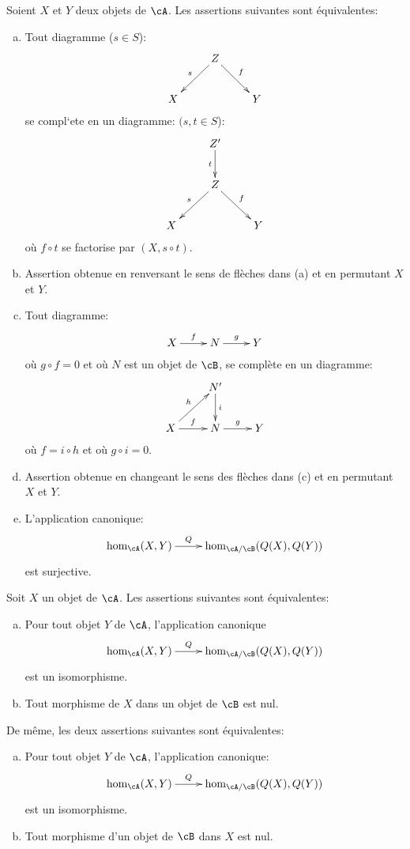 \begin{proposition}\label{VIII:2-5-2}
Soient $X$ et $Y$ deux objets de $\cA$. Les assertions suivantes sont 
\'equivalentes: 
\begin{enumerate}[(a)]
  \item Tout diagramme ($s\in S$): 
    \[\xymatrix{
      & Z \ar[dl]_-s \ar[dr]^-f \\
      X 
        & & Y 
    }\]
    se compl`ete en un diagramme: $(s,t\in S$): 
    \[\xymatrix{
      & Z' \ar[d]_-t \\
      & Z \ar[dl]_-s \ar[dr]^-f \\
      X 
        & & Y 
    }\]
    o\`u $f\circ t$ se factorise par $(X,s\circ t)$. 
  \item Assertion obtenue en renversant le sens de fl\`eches dans (a) et en 
    permutant $X$ et $Y$. 
  \item Tout diagramme: 
    \[\xymatrix{
      X \ar[r]^-f 
        & N \ar[r]^-g 
        & Y 
    }\]
    o\`u $g\circ f=0$ et o\`u $N$ est un objet de $\cB$, se compl\`ete en un 
    diagramme: 
    \[\xymatrix{
      & N' \ar[d]^-i \\
      X \ar[ur]^-h \ar[r]^-f 
        & N \ar[r]^-g 
        & Y 
    }\]
    o\`u $f=i\circ h$ et o\`u $g\circ i=0$. 
  \item Assertion obtenue en changeant le sens des fl\`eches dans (c) et en 
    permutant $X$ et $Y$. 
  \item L'application canonique: 
    \[\xymatrix{
      \hom_\cA(X,Y) \ar[r]^-Q 
        & \hom_{\cA/\cB}(Q(X),Q(Y)) 
    }\]
    est surjective. 
\end{enumerate}
\end{proposition}





\begin{proposition}\label{VIII:2-5-3}
Soit $X$ un objet de $\cA$. Les assertions suivantes sont \'equivalentes: 
\begin{enumerate}[(a)]
  \item Pour tout objet $Y$ de $\cA$, l'application canonique 
    \[\xymatrix{
      \hom_\cA(X,Y) \ar[r]^-Q 
        & \hom_{\cA/\cB}(Q(X),Q(Y)) 
    }\]
    est un isomorphisme. 
  \item Tout morphisme de $X$ dans un objet de $\cB$ est nul. 
\end{enumerate}
De m\^eme, les deux assertions suivantes sont \'equivalentes: 
\begin{enumerate}[(a)']
  \item Pour tout objet $Y$ de $\cA$, l'application canonique: 
    \[\xymatrix{
      \hom_\cA(X,Y) \ar[r]^-Q 
        & \hom_{\cA/\cB}(Q(X),Q(Y)) 
    }\]
    est un isomorphisme. 
  \item Tout morphisme d'un objet de $\cB$ dans $X$ est nul. 
\end{enumerate}
\end{proposition}





